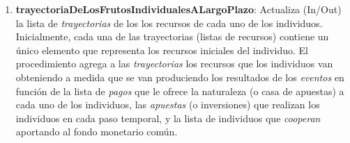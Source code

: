 \documentclass[10pt,a4paper]{article}
\begin{document}
\begin{enumerate}
    \clearpage

    \item \textbf{trayectoriaDeLosFrutosIndividualesALargoPlazo}: Actualiza (In/Out) la lista de \textit{trayectorias} de los los recursos de cada uno de los individuos. Inicialmente, cada una de las trayectorias (listas de recursos) contiene un único elemento que representa los recursos iniciales del individuo. El procedimiento agrega a las \textit{trayectorias} los recursos que los individuos van obteniendo a medida que se van produciendo los resultados de los \textit{eventos} en función de la lista de \textit{pagos} que le ofrece la naturaleza (o casa de apuestas) a cada uno de los individuos, las \textit{apuestas} (o inversiones) que realizan los individuos en cada paso temporal, y la lista de individuos que \textit{cooperan} aportando al fondo monetario común.
    

\end{enumerate}
\end{document}
